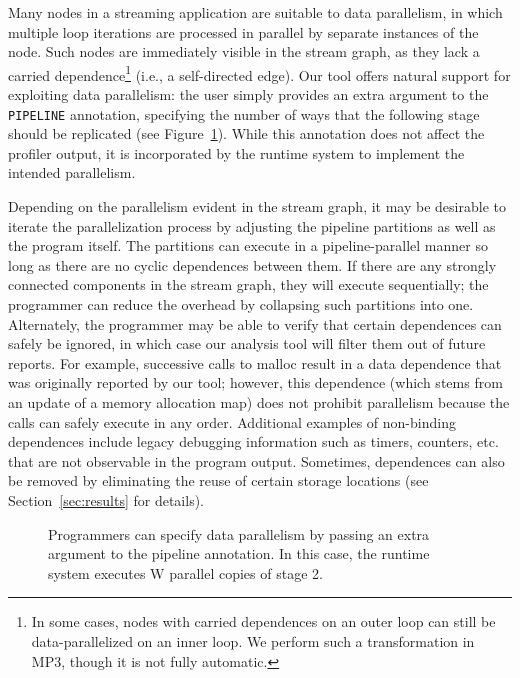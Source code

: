 Many nodes in a streaming application are suitable to data
parallelism, in which multiple loop iterations are processed in
parallel by separate instances of the node.  Such nodes are
immediately visible in the stream graph, as they lack a carried
dependence\footnote{In some cases, nodes with carried dependences on
  an outer loop can still be data-parallelized on an inner loop.  We
  perform such a transformation in MP3, though it is not fully
  automatic.} (i.e., a self-directed edge).  Our tool offers natural
support for exploiting data parallelism: the user simply provides an
extra argument to the {\tt PIPELINE} annotation, specifying the number
of ways that the following stage should be replicated (see
Figure~\ref{fig:data-parallelism}).  While this annotation does not
affect the profiler output, it is incorporated by the runtime system
to implement the intended parallelism.

Depending on the parallelism evident in the stream graph, it may be
desirable to iterate the parallelization process by adjusting the
pipeline partitions as well as the program itself.  The partitions can
execute in a pipeline-parallel manner so long as there are no cyclic
dependences between them.  If there are any strongly connected
components in the stream graph, they will execute sequentially; the
programmer can reduce the overhead by collapsing such partitions into
one.  Alternately, the programmer may be able to verify that certain
dependences can safely be ignored, in which case our analysis tool
will filter them out of future reports.  For example, successive calls
to malloc result in a data dependence that was originally reported by
our tool; however, this dependence (which stems from an update of a
memory allocation map) does not prohibit parallelism because the calls
can safely execute in any order.  Additional examples of non-binding
dependences include legacy debugging information such as timers,
counters, etc. that are not observable in the program output.
Sometimes, dependences can also be removed by eliminating the reuse of
certain storage locations (see Section~\ref{sec:results} for details).

\begin{figure}[t]
\centering
{}
\vspace{-6pt}
\caption[Specifying data parallelism.]{Programmers can specify data
  parallelism by passing an extra argument to the pipeline annotation.
  In this case, the runtime system executes W parallel copies of stage
  2.  \protect\label{fig:data-parallelism}}
\vspace{-6pt}
\end{figure}

